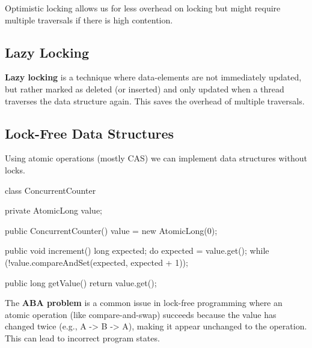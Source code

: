 \begin{remark}
    Optimistic locking allows us for less overhead on locking but might require multiple traversals if there is high contention.
\end{remark}

\subsection{Lazy Locking}

\begin{definition}
    \textbf{Lazy locking} is a technique where data-elements are not immediately updated, but rather marked as deleted (or inserted) and only updated when a thread traverses the data structure again. This saves the overhead of multiple traversals.
\end{definition}

\subsection{Lock-Free Data Structures}

\begin{remark}
    Using atomic operations (mostly CAS) we can implement data structures without locks. 
\end{remark}

\begin{codeexample}
class ConcurrentCounter {
    private AtomicLong value;
    
    public ConcurrentCounter() {
        value = new AtomicLong(0);
    }
    
    public void increment() {
        long expected;
        do {
            expected = value.get();
        } while (!value.compareAndSet(expected, expected + 1));
    }
    
    public long getValue() {
        return value.get();
    }
}
\end{codeexample}

\begin{important}
    The \textbf{ABA problem} is a common issue in lock-free programming where an atomic operation (like compare-and-swap) succeeds because the value has changed twice (e.g., A -> B -> A), making it appear unchanged to the operation. This can lead to incorrect program states.
\end{important}
